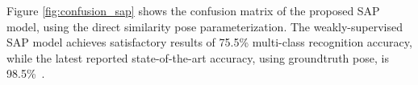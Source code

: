 


Figure \ref{fig:confusion_sap} shows the confusion matrix of the proposed SAP model, using the direct similarity pose parameterization.  
The weakly-supervised SAP model achieves satisfactory results of 75.5\% multi-class recognition accuracy, while the latest reported state-of-the-art accuracy, using groundtruth pose, is 98.5\%~\cite{Woodford2013}. %

